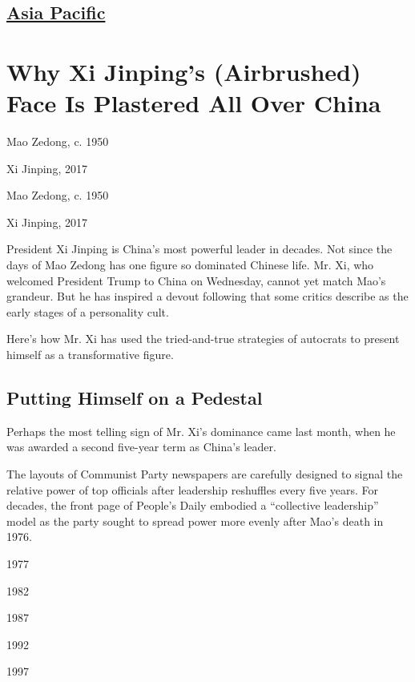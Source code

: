 \hypertarget{-asia-pacific-}{%
\subsection{\texorpdfstring{ \href{/section/world/asia}{Asia Pacific}
}{ Asia Pacific }}\label{-asia-pacific-}}

\hypertarget{why-xi-jinpings-airbrushed-face-is-plastered-all-over-china}{%
\section{Why Xi Jinping's (Airbrushed) Face Is Plastered All Over
China}\label{why-xi-jinpings-airbrushed-face-is-plastered-all-over-china}}

Mao Zedong, c. 1950

Xi Jinping, 2017

Mao Zedong, c. 1950

Xi Jinping, 2017

President Xi Jinping is China's most powerful leader in decades. Not
since the days of Mao Zedong has one figure so dominated Chinese life.
Mr. Xi, who welcomed President Trump to China on Wednesday, cannot yet
match Mao's grandeur. But he has inspired a devout following that some
critics describe as the early stages of a personality cult.

Here's how Mr. Xi has used the tried-and-true strategies of autocrats to
present himself as a transformative figure.

\hypertarget{putting-himself-on-a-pedestal}{%
\subsection{Putting Himself on a
Pedestal}\label{putting-himself-on-a-pedestal}}

Perhaps the most telling sign of Mr. Xi's dominance came last month,
when he was awarded a second five-year term as China's leader.

The layouts of Communist Party newspapers are carefully designed to
signal the relative power of top officials after leadership reshuffles
every five years. For decades, the front page of People's Daily embodied
a ``collective leadership'' model as the party sought to spread power
more evenly after Mao's death in 1976.

1977

1982

1987

1992

1997


